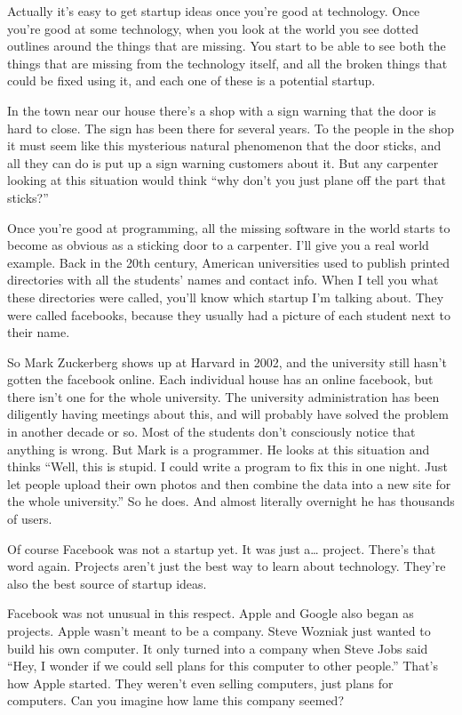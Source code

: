 Actually it's easy to get startup ideas once you're good at technology.
Once you're good at some technology, when you look at the world you see
dotted outlines around the things that are missing. You start to be able
to see both the things that are missing from the technology itself, and
all the broken things that could be fixed using it, and each one of
these is a potential startup.

In the town near our house there's a shop with a sign warning that the
door is hard to close. The sign has been there for several years. To the
people in the shop it must seem like this mysterious natural phenomenon
that the door sticks, and all they can do is put up a sign warning
customers about it. But any carpenter looking at this situation would
think ``why don't you just plane off the part that sticks?''

Once you're good at programming, all the missing software in the world
starts to become as obvious as a sticking door to a carpenter. I'll give
you a real world example. Back in the 20th century, American
universities used to publish printed directories with all the students'
names and contact info. When I tell you what these directories were
called, you'll know which startup I'm talking about. They were called
facebooks, because they usually had a picture of each student next to
their name.

So Mark Zuckerberg shows up at Harvard in 2002, and the university still
hasn't gotten the facebook online. Each individual house has an online
facebook, but there isn't one for the whole university. The university
administration has been diligently having meetings about this, and will
probably have solved the problem in another decade or so. Most of the
students don't consciously notice that anything is wrong. But Mark is a
programmer. He looks at this situation and thinks ``Well, this is
stupid. I could write a program to fix this in one night. Just let
people upload their own photos and then combine the data into a new site
for the whole university.'' So he does. And almost literally overnight
he has thousands of users.

Of course Facebook was not a startup yet. It was just a\ldots{} project.
There's that word again. Projects aren't just the best way to learn
about technology. They're also the best source of startup ideas.

Facebook was not unusual in this respect. Apple and Google also began as
projects. Apple wasn't meant to be a company. Steve Wozniak just wanted
to build his own computer. It only turned into a company when Steve Jobs
said ``Hey, I wonder if we could sell plans for this computer to other
people.'' That's how Apple started. They weren't even selling computers,
just plans for computers. Can you imagine how lame this company seemed?


